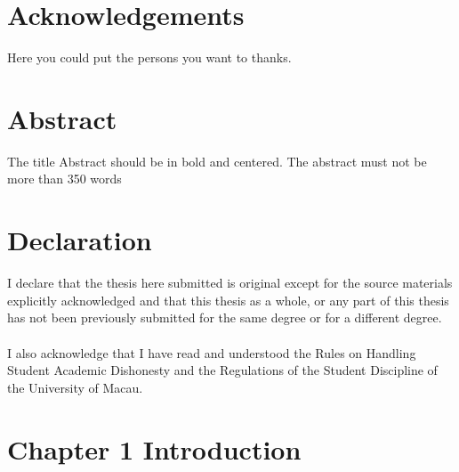 \documentclass[a4paper, 12pt, twoside]{article}
\begin{document}
\restoregeometry
\setcounter{page}{1}
\section*{Acknowledgements}
Here you could put the persons you want to thanks. 

\newpage

\section*{Abstract}
The title Abstract should be in bold and centered. The abstract must not be more than 350 words
\newpage

\section*{Declaration}
I declare that the thesis here submitted is original except for the source materials explicitly acknowledged  and that this thesis as a whole, or any part of this thesis has not been previously submitted for the same degree or for a different degree.\\ \\ 
I also acknowledge that I have read and understood the Rules on Handling Student Academic Dishonesty and the Regulations of the Student Discipline of the University of Macau.

\newpage

\renewcommand\contentsname{Table of Contents}
\tableofcontents

\newpage
\singlespacing
\listoffigures
\newpage
\listoftables

\newpage 
\setcounter{page}{1}
\section*{Chapter 1 Introduction}
\label{sec:intro}
\setcounter{section}{1}
\doublespacing

\end{document}
